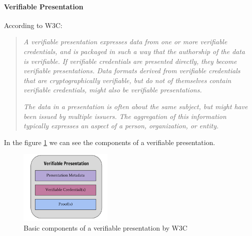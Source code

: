 \documentclass[a4paper, 12pt]{article} %
\begin{document}
                \paragraph{Verifiable Presentation}
                    According to W3C\cite{w3c-vc}:
                    \begin{quote}
                        \textit{A verifiable presentation expresses data from one or more verifiable credentials, and is packaged in such a way that the authorship of the data is verifiable. If verifiable credentials are presented directly, they become verifiable presentations. Data formats derived from verifiable credentials that are cryptographically verifiable, but do not of themselves contain verifiable credentials, might also be verifiable presentations.}
                        
                        \textit{The data in a presentation is often about the same subject, but might have been issued by multiple issuers. The aggregation of this information typically expresses an aspect of a person, organization, or entity.}
                    \end{quote}
                    In the figure \ref{fig:ssi-vp} we can see the components of a verifiable presentation.
                    \begin{figure}[h] 
                        \centering
                        \includegraphics[width=0.4\textwidth]{ssi-vp.png}
                        \caption{Basic components of a verifiable presentation by W3C}
                        \label{fig:ssi-vp}
                    \end{figure}
                \newpage %
\end{document}
